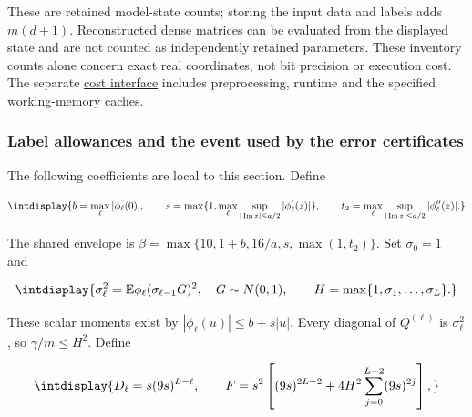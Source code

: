 
These are retained model-state counts; storing the input data and labels adds \(m(d+1)\). Reconstructed dense matrices can be evaluated from the displayed state and are not counted as independently retained parameters. These inventory counts alone concern exact real coordinates, not bit precision or execution cost. The separate \hyperref[int:computational-costs]{cost interface} includes preprocessing, runtime and the specified working-memory caches.


\subsubsection{Label allowances and the event used by the error certificates}
\label{int:legendre-labels}


The following coefficients are local to this section. Define


\begingroup\renewcommand{\theHequation}{intdisplay.107}
\begin{equation*}
\intdisplay{
b=\max_\ell|\phi_\ell(0)|,\qquad
s=\max\{1,\max_\ell\sup_{|\operatorname{Im}z|\le a/2}
|\phi_\ell'(z)|\},\qquad
t_2=\max_\ell\sup_{|\operatorname{Im}z|\le a/2}|\phi_\ell''(z)|.
}
\end{equation*}
\endgroup


The shared envelope is \(\beta=\max\{10,\allowbreak 1+b,\allowbreak 16/a,\allowbreak s,\allowbreak \max(1,\allowbreak t_2)\}\). Set \(\sigma_0=1\) and


\begingroup\renewcommand{\theHequation}{intdisplay.108}
\begin{equation*}
\intdisplay{
\sigma_\ell^2=\mathbb E\phi_\ell(\sigma_{\ell-1}G)^2,
\quad G\sim N(0,1),\qquad
H=\max\{1,\sigma_1,\ldots,\sigma_L\}.
}
\end{equation*}
\endgroup


These scalar moments exist by \(|\phi_\ell(u)|\le b+s|u|\). Every diagonal of \(Q^{(\ell)}\) is \(\sigma_\ell^2\), so \(\gamma/m\le H^2\). Define


\begingroup\renewcommand{\theHequation}{intdisplay.109}
\begin{equation*}
\intdisplay{
D_\ell=s(9s)^{L-\ell},\qquad
F=s^2\left[(9s)^{2L-2}
+4H^2\sum_{j=0}^{L-2}(9s)^{2j}\right],
}
\end{equation*}
\endgroup

